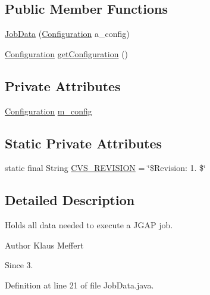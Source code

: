 \subsection*{Public Member Functions}
\begin{DoxyCompactItemize}
\item 
\hyperlink{classorg_1_1jgap_1_1impl_1_1job_1_1_job_data_a986f8f826373b74ca167df1069c7b109}{Job\-Data} (\hyperlink{classorg_1_1jgap_1_1_configuration}{Configuration} a\-\_\-config)
\item 
\hyperlink{classorg_1_1jgap_1_1_configuration}{Configuration} \hyperlink{classorg_1_1jgap_1_1impl_1_1job_1_1_job_data_a679babd7cb965abd5ce1952d639abbf0}{get\-Configuration} ()
\end{DoxyCompactItemize}
\subsection*{Private Attributes}
\begin{DoxyCompactItemize}
\item 
\hyperlink{classorg_1_1jgap_1_1_configuration}{Configuration} \hyperlink{classorg_1_1jgap_1_1impl_1_1job_1_1_job_data_a1e1a5782bf7834d1de16a5be230a38fb}{m\-\_\-config}
\end{DoxyCompactItemize}
\subsection*{Static Private Attributes}
\begin{DoxyCompactItemize}
\item 
static final String \hyperlink{classorg_1_1jgap_1_1impl_1_1job_1_1_job_data_af6508c806e077f3d00de46e728397dae}{C\-V\-S\-\_\-\-R\-E\-V\-I\-S\-I\-O\-N} = \char`\"{}\$Revision\-: 1. \$\char`\"{}
\end{DoxyCompactItemize}


\subsection{Detailed Description}
Holds all data needed to execute a J\-G\-A\-P job.

\begin{DoxyAuthor}{Author}
Klaus Meffert 
\end{DoxyAuthor}
\begin{DoxySince}{Since}
3. 
\end{DoxySince}


Definition at line 21 of file Job\-Data.\-java.



